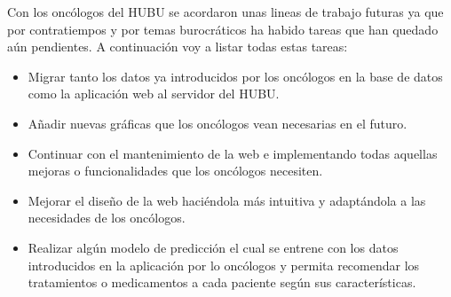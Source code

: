 Con los oncólogos del HUBU se acordaron unas lineas de trabajo futuras ya que por contratiempos y por temas burocráticos ha habido tareas que han quedado aún pendientes. A continuación voy a listar todas estas tareas:

\begin{itemize}
    \item Migrar tanto los datos ya introducidos por los oncólogos en la base de datos como la aplicación web al servidor del HUBU. 
    \item Añadir nuevas gráficas que los oncólogos vean necesarias en el futuro.
    \item Continuar con el mantenimiento de la web e implementando todas aquellas mejoras o funcionalidades que los oncólogos necesiten.
    \item Mejorar el diseño de la web haciéndola más intuitiva y adaptándola a las necesidades de los oncólogos.
    \item Realizar algún modelo de predicción el cual se entrene con los datos introducidos en la aplicación por lo oncólogos y permita recomendar los tratamientos o medicamentos a cada paciente según sus características.
\end{itemize}
